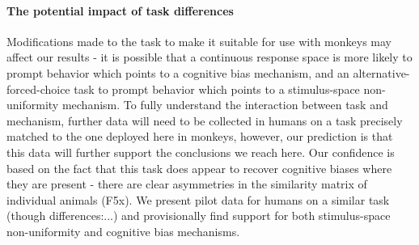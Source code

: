 \documentclass[9pt,biorxiv,lineno,onehalfspacing]{lapreprint}
\begin{document}
\begin{refsection}
\paragraph{The potential impact of task differences}

Modifications made to the task to make it suitable for use with monkeys may affect our results - it is possible that a continuous response space is more likely to prompt behavior which points to a cognitive bias mechanism, and an alternative-forced-choice task to prompt behavior which points to a stimulus-space non-uniformity mechanism.
To fully understand the interaction between task and mechanism, further data will need to be collected in humans on a task precisely matched to the one deployed here in monkeys, however, our prediction is that this data will further support the conclusions we reach here.
Our confidence is based on the fact that this task does appear to recover cognitive biases where they are present - there are clear asymmetries in the similarity matrix of individual animals (F5x).
We present pilot data for humans on a similar task (though differences:...) and provisionally find support for both stimulus-space non-uniformity and cognitive bias mechanisms.


\end{refsection}
\end{document}
